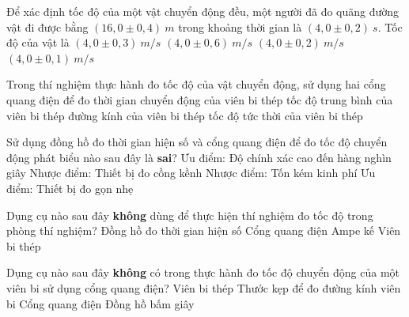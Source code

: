 \begin{ex}
Để xác định tốc độ của một vật chuyển động đều, một người đã đo quãng đường vật đi được bằng $(16,0 \pm 0,4)\ m$ trong khoảng thời gian là $(4,0 \pm 0,2)\ s$. Tốc độ của vật là
\choice
{\True $(4,0 \pm 0,3)\ m/s$}
{$(4,0 \pm 0,6)\ m/s$}
{$(4,0 \pm 0,2)\ m/s$}
{$(4,0 \pm 0,1)\ m/s$}
\end{ex}
\begin{ex}%
Trong thí nghiệm thực hành đo tốc độ của vật chuyển động, sử dụng hai cổng quang điện để đo
\choice
{\True thời gian chuyển động của viên bi thép}
{tốc độ trung bình của viên bi thép}
{đường kính của viên bi thép}
{tốc độ tức thời của viên bi thép}

\loigiai{
}
 \end{ex}
\begin{ex}%
Sử dụng đồng hồ đo thời gian hiện số và cổng quang điện để đo tốc độ chuyển động phát biểu nào sau đây là \textbf{sai}?
\choice
{Ưu điểm: Độ chính xác cao đến hàng nghìn giây}
{Nhược điểm: Thiết bị đo cồng kềnh}
{Nhược điểm: Tốn kém kinh phí}
{\True Ưu điểm: Thiết bị đo gọn nhẹ}
\loigiai{

}
 \end{ex}
\begin{ex}%
Dụng cụ nào sau đây \textbf{không} dùng để thực hiện thí nghiệm đo tốc độ trong phòng thí nghiệm?
\choice
{Đồng hồ đo thời gian hiện số}
{Cổng quang điện}
{\True Ampe kế}
{Viên bi thép}

\loigiai{
}
 \end{ex}
\begin{ex}%
Dụng cụ nào sau đây \textbf{không} có trong thực hành đo tốc độ chuyển động của một viên bi sử dụng cổng quang điện?
\choice
{Viên bi thép}
{\True Thước kẹp để đo đường kính viên bi}
{Cổng quang điện}
{Đồng hồ bấm giây}
\loigiai{
}
 \end{ex}
